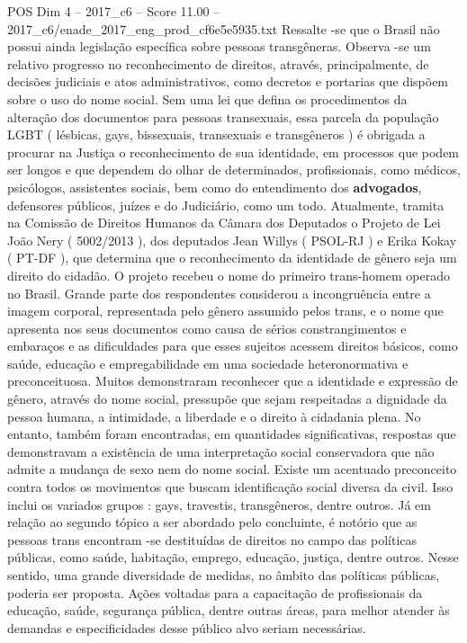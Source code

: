 \begin{textsample}{POS Dim 4 – 2017\_c6 – Score 11.00 – 2017\_c6/enade\_2017\_eng\_prod\_cf6e5e5935.txt}
Ressalte -se que o Brasil não possui ainda legislação específica sobre pessoas transgêneras.
Observa -se um relativo progresso no reconhecimento de direitos, através, principalmente, de decisões judiciais e atos administrativos, como decretos e portarias que dispõem sobre o uso do nome social.
Sem uma lei que defina os procedimentos da alteração dos documentos para pessoas transexuais, essa parcela da população LGBT ( lésbicas, gays, bissexuais, transexuais e transgêneros ) é obrigada a procurar na Justiça o reconhecimento de sua identidade, em processos que podem ser longos e que dependem do olhar de determinados, profissionais, como médicos, psicólogos, assistentes sociais, bem como do entendimento dos \textbf{advogados}, defensores públicos, juízes e do Judiciário, como um todo.
Atualmente, tramita na Comissão de Direitos Humanos da Câmara dos Deputados o Projeto de Lei João Nery ( 5002/2013 ), dos deputados Jean Willys ( PSOL-RJ ) e Erika Kokay ( PT-DF ), que determina que o reconhecimento da identidade de gênero seja um direito do cidadão.
O projeto recebeu o nome do primeiro trans-homem operado no Brasil.
Grande parte dos respondentes considerou a incongruência entre a imagem corporal, representada pelo gênero assumido pelos trans, e o nome que apresenta nos seus documentos como causa de sérios constrangimentos e embaraços e as dificuldades para que esses sujeitos acessem direitos básicos, como saúde, educação e empregabilidade em uma sociedade heteronormativa e preconceituosa.
Muitos demonstraram reconhecer que a identidade e expressão de gênero, através do nome social, pressupõe que sejam respeitadas a dignidade da pessoa humana, a intimidade, a liberdade e o direito à cidadania plena.
No entanto, também foram encontradas, em quantidades significativas, respostas que demonstravam a existência de uma interpretação social conservadora que não admite a mudança de sexo nem do nome social.
Existe um acentuado preconceito contra todos os movimentos que buscam identificação social diversa da civil.
Isso inclui os variados grupos : gays, travestis, transgêneros, dentre outros.
Já em relação ao segundo tópico a ser abordado pelo concluinte, é notório que as pessoas trans encontram -se destituídas de direitos no campo das políticas públicas, como saúde, habitação, emprego, educação, justiça, dentre outros.
Nesse sentido, uma grande diversidade de medidas, no âmbito das políticas públicas, poderia ser proposta.
Ações voltadas para a capacitação de profissionais da educação, saúde, segurança pública, dentre outras áreas, para melhor atender às demandas e especificidades desse público alvo seriam necessárias.

\end{textsample}
